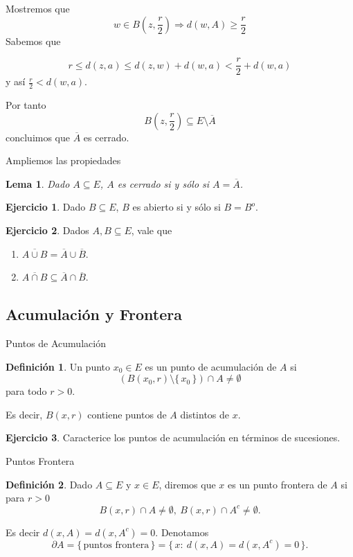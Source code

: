 \documentclass[utf8]{beamer}
\theoremstyle{plain}
\newtheorem{Lem}{Lema}                 %
\theoremstyle{definition}
\newtheorem{Def}{Definición}           %
\newtheorem{Ej}{Ejercicio}             %
\theoremstyle{remark}
\numberwithin{equation}{section}
\newcommand{\set}[1]{\{\,#1\,\}}    %
\renewcommand{\geq}{\geqslant}          %
\renewcommand{\leq}{\leqslant}          %
\newcommand{\less}{\setminus}           %
\newcommand{\To}{\Rightarrow}
\newcommand{\ov}{\overline}
\newcommand{\del}{\partial}
\begin{document}
\begin{frame}
    Mostremos que  
    $$w\in B\left(z,\frac r2\right)\To d(w,A)\geq \frac r2 $$
    Sabemos que\par
    $$r\leq d(z,a)\leq d(z,w)+d(w,a)<\frac r2+d(w,a)$$
    y as\'i $\frac r2<d(w,a)$.\par 
    Por tanto 
    $$B\left(z,\frac r2\right)\subseteq E\less\ov A$$
    concluimos que $\ov A$ es cerrado.
\end{frame}

\begin{frame}{Ampliemos las propiedades}
    \begin{Lem}
        Dado $A\subseteq E$, $A$ es cerrado si y s\'olo si $A=\ov A$.
    \end{Lem}
    \begin{Ej}\label{ej:abiertoIffInterior}
        Dado $B\subseteq E$, $B$ es abierto si y s\'olo si $B=B^o$. 
    \end{Ej}
    \begin{Ej}\label{ej:propsClausura}
        Dados $A,B\subseteq E$, vale que 
        \begin{enumerate}
            \item $\ov{A\cup B}=\ov A\cup\ov B$.
            \item $\ov{A\cap B}\subseteq \ov A\cap \ov B$.
        \end{enumerate}
    \end{Ej}
\end{frame}

\subsection{Acumulaci\'on y Frontera}
\begin{frame}{Puntos de Acumulaci\'on}
    \begin{Def}
        Un punto $x_0\in E$ es un \alert{punto de acumulaci\'on} de $A$ si 
        $$\left(B(x_0,r)\setminus\set{x_0}\right)\cap A \neq \emptyset$$
         para todo $r>0$. 
    \end{Def}

    Es decir, $B(x,r)$ contiene puntos de $A$ distintos de $x$.
   \begin{Ej}\label{ej:ptosAccumComoSuccs}
        Caracterice los puntos de acumulación en términos de sucesiones.
      \end{Ej}

\end{frame}

\begin{frame}{Puntos Frontera}
    \begin{Def}
        Dado $A\subseteq E$ y $x\in E$, diremos que $x$ es un \alert{punto frontera} de $A$ si para $r>0$
        $$B(x,r)\cap A\neq\emptyset,\ B(x,r)\cap A^c\neq\emptyset.$$
        
    \end{Def}
    Es decir $d(x,A)=d(x,A^c)=0$. Denotamos
    $$\del A=\set{\text{puntos frontera}}=\set{x:\ d(x,A)=d(x,A^c)=0}.$$
\end{frame}
\end{document}
